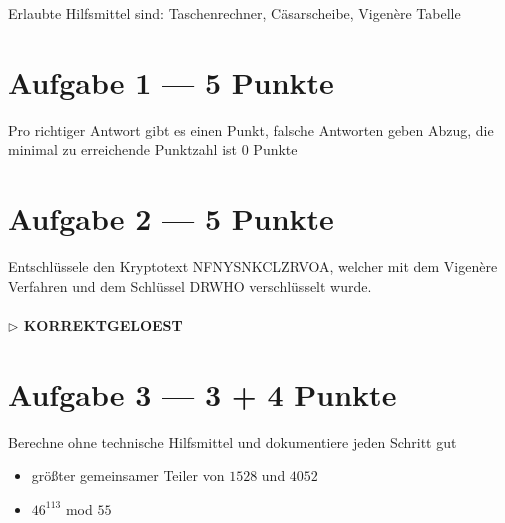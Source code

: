 \documentclass{../crypto_2}
\date{03. Februar 2016}
\begin{document}
\maketitle

Erlaubte Hilfsmittel sind: Taschenrechner, Cäsarscheibe, Vigenère Tabelle

\section*{Aufgabe 1 --- 5 Punkte}
Pro richtiger Antwort gibt es einen Punkt, falsche Antworten geben Abzug, die minimal zu erreichende Punktzahl ist 0 Punkte
\medskip \\
\begin{alterqcm}[lq=13cm,language=german, symb = \dingsquare,
corsymb = \dingchecksquare, correction] 
\end{alterqcm}

\section*{Aufgabe 2 --- 5 Punkte}
Entschlüssele den Kryptotext NFNYSNKCLZRVOA, welcher mit dem Vigenère Verfahren und dem Schlüssel DRWHO verschlüsselt wurde.

\paragraph{$\triangleright$ KORREKTGELOEST}

\section*{Aufgabe 3 --- 3 + 4 Punkte}
Berechne ohne technische Hilfsmittel und dokumentiere jeden Schritt gut\begin{itemize}
\item größter gemeinsamer Teiler von $1528$ und $4052$
\item $46^{113}$ mod $55$
\end{itemize}
\end{document}
